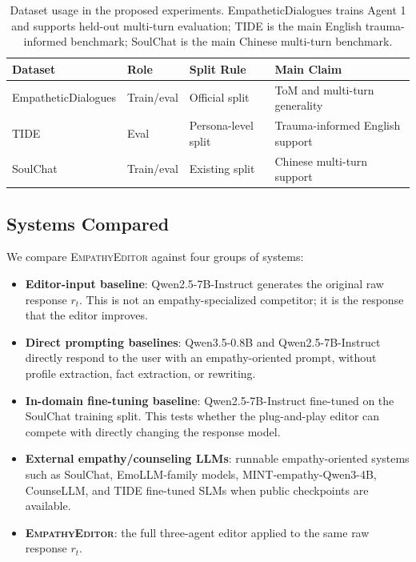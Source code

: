 \documentclass[11pt]{article}
\begin{document}
\begin{table}[t]
\centering
\small
\begin{tabular}{llll}
\toprule
\textbf{Dataset} & \textbf{Role} & \textbf{Split Rule} & \textbf{Main Claim} \\
\midrule
EmpatheticDialogues & Train/eval & Official split & ToM and multi-turn generality \\
TIDE & Eval & Persona-level split & Trauma-informed English support \\
SoulChat & Train/eval & Existing split & Chinese multi-turn support \\
\bottomrule
\end{tabular}
\caption{Dataset usage in the proposed experiments. EmpatheticDialogues trains Agent 1 and supports held-out multi-turn evaluation; TIDE is the main English trauma-informed benchmark; SoulChat is the main Chinese multi-turn benchmark.}
\label{tab:dataset_roles}
\end{table}

\subsection{Systems Compared}

We compare \textsc{EmpathyEditor} against four groups of systems:

\begin{itemize}
    \item \textbf{Editor-input baseline}: Qwen2.5-7B-Instruct generates the original raw response $r_t$. This is not an empathy-specialized competitor; it is the response that the editor improves.
    \item \textbf{Direct prompting baselines}: Qwen3.5-0.8B and Qwen2.5-7B-Instruct directly respond to the user with an empathy-oriented prompt, without profile extraction, fact extraction, or rewriting.
    \item \textbf{In-domain fine-tuning baseline}: Qwen2.5-7B-Instruct fine-tuned on the SoulChat training split. This tests whether the plug-and-play editor can compete with directly changing the response model.
    \item \textbf{External empathy/counseling LLMs}: runnable empathy-oriented systems such as SoulChat, EmoLLM-family models, MINT-empathy-Qwen3-4B, CounseLLM, and TIDE fine-tuned SLMs when public checkpoints are available.
    \item \textbf{\textsc{EmpathyEditor}}: the full three-agent editor applied to the same raw response $r_t$.
\end{itemize}
\end{document}
